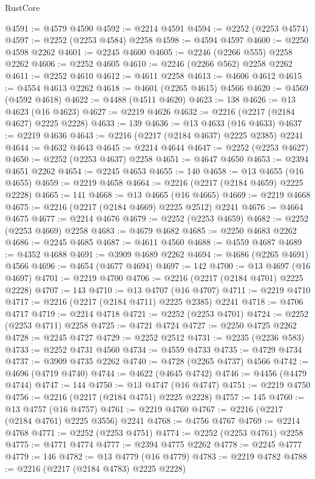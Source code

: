\begin{lexlean}{RustCore}
\begin{coremodule}
@4591 := @4579 @4590
@4592 := @2214 @4591
@4594 := @2252 (@2253 @4574)
@4597 := @2252 (@2253 @4584) @2258
@4598 := @4594 @4597
@4600 := @2250 @4598 @2262
@4601 := @2245 @4600
@4605 := @2246 (@2266 @555) @2258 @2262
@4606 := @2252 @4605
@4610 := @2246 (@2266 @562) @2258 @2262
@4611 := @2252 @4610
@4612 := @4611 @2258
@4613 := @4606 @4612
@4615 := @4554 @4613 @2262
@4618 := @4601 (@2265 @4615) @4566
@4620 := @4569 (@4592 @4618)
@4622 := @4488 (@4511 @4620)
@4623 := 138
@4626 := @13 @4623 (@16 @4623)
@4627 := @2219 @4626
@4632 := @2216 (@2217 (@2184 @4627) @2225 @2228)
@4633 := 139
@4636 := @13 @4633 (@16 @4633)
@4637 := @2219 @4636
@4643 := @2216 (@2217 (@2184 @4637) @2225 @2385) @2241
@4644 := @4632 @4643
@4645 := @2214 @4644
@4647 := @2252 (@2253 @4627)
@4650 := @2252 (@2253 @4637) @2258
@4651 := @4647 @4650
@4653 := @2394 @4651 @2262
@4654 := @2245 @4653
@4655 := 140
@4658 := @13 @4655 (@16 @4655)
@4659 := @2219 @4658
@4664 := @2216 (@2217 (@2184 @4659) @2225 @2228)
@4665 := 141
@4668 := @13 @4665 (@16 @4665)
@4669 := @2219 @4668
@4675 := @2216 (@2217 (@2184 @4669) @2225 @2512) @2241
@4676 := @4664 @4675
@4677 := @2214 @4676
@4679 := @2252 (@2253 @4659)
@4682 := @2252 (@2253 @4669) @2258
@4683 := @4679 @4682
@4685 := @2250 @4683 @2262
@4686 := @2245 @4685
@4687 := @4611 @4560
@4688 := @4559 @4687
@4689 := @4352 @4688
@4691 := @3909 @4689 @2262
@4694 := @4686 (@2265 @4691) @4566
@4696 := @4654 (@4677 @4694)
@4697 := 142
@4700 := @13 @4697 (@16 @4697)
@4701 := @2219 @4700
@4706 := @2216 (@2217 (@2184 @4701) @2225 @2228)
@4707 := 143
@4710 := @13 @4707 (@16 @4707)
@4711 := @2219 @4710
@4717 := @2216 (@2217 (@2184 @4711) @2225 @2385) @2241
@4718 := @4706 @4717
@4719 := @2214 @4718
@4721 := @2252 (@2253 @4701)
@4724 := @2252 (@2253 @4711) @2258
@4725 := @4721 @4724
@4727 := @2250 @4725 @2262
@4728 := @2245 @4727
@4729 := @2252 @2512
@4731 := @2235 (@2236 @583)
@4733 := @2252 @4731 @4560
@4734 := @4559 @4733
@4735 := @4729 @4734
@4737 := @3909 @4735 @2262
@4740 := @4728 (@2265 @4737) @4566
@4742 := @4696 (@4719 @4740)
@4744 := @4622 (@4645 @4742)
@4746 := @4456 (@4479 @4744)
@4747 := 144
@4750 := @13 @4747 (@16 @4747)
@4751 := @2219 @4750
@4756 := @2216 (@2217 (@2184 @4751) @2225 @2228)
@4757 := 145
@4760 := @13 @4757 (@16 @4757)
@4761 := @2219 @4760
@4767 := @2216 (@2217 (@2184 @4761) @2225 @3556) @2241
@4768 := @4756 @4767
@4769 := @2214 @4768
@4771 := @2252 (@2253 @4751)
@4774 := @2252 (@2253 @4761) @2258
@4775 := @4771 @4774
@4777 := @2394 @4775 @2262
@4778 := @2245 @4777
@4779 := 146
@4782 := @13 @4779 (@16 @4779)
@4783 := @2219 @4782
@4788 := @2216 (@2217 (@2184 @4783) @2225 @2228)

\end{coremodule}
\end{lexlean}
